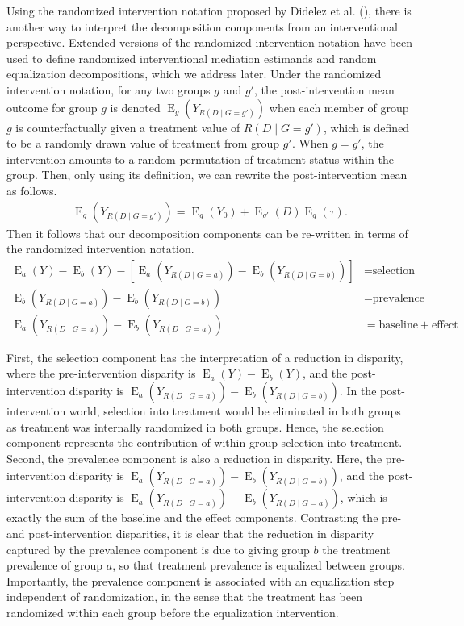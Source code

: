 \documentclass[12pt,a4paper]{article}
\newcommand{\E}{\operatorname{E}}
\begin{document}
Using the randomized intervention notation proposed by Didelez et al. (\citeyear{didelez_direct_2006}), there is another way to interpret the decomposition components from an interventional perspective. Extended versions of the randomized intervention notation have been used to define randomized interventional mediation estimands and random equalization decompositions, which we address later. 
Under the randomized intervention notation, for any two groups $g$ and $g'$, the post-intervention mean outcome for group $g$ is denoted $\E_g \left(Y_{R(D \mid  G=g') } \right)$ when each member of group $g$ is counterfactually given a treatment value of $R(D \mid  G=g')$, which is defined to be a randomly drawn value of treatment from group $g'$. When $g=g'$, the intervention amounts to a random permutation of treatment status within the group. Then, only using its definition, we can rewrite the post-intervention mean as follows.
\begin{align}
    \E_g \left(Y_{R(D \mid  G=g') } \right) = \E_g (Y_0) + \E_{g'}(D)\E_g(\tau). \label{eqt2}
\end{align}
Then it follows that our decomposition components can be re-written in terms of the randomized intervention notation.
\begin{align*}
   \E_a(Y) - \E_b(Y) - \left[ \E_a \left(Y_{R(D \mid G=a)} \right) - \E_b \left(Y_{R(D \mid G=b)}\right) \right] &= \text{selection} \\
   \E_b \left(Y_{R(D \mid G=a)} \right)-\E_b \left(Y_{R(D \mid G=b)} \right)  &= \text{prevalence} \\
   \E_a \left(Y_{R(D \mid G=a)} \right)-\E_b \left(Y_{R(D \mid G=a)} \right)  &= \text{baseline} + \text{effect} 
\end{align*}

First, the selection component has the interpretation of a reduction in disparity, where the pre-intervention disparity is $\E_a(Y) - \E_b(Y)$, and the post-intervention disparity is $\E_a \left(Y_{R(D \mid G=a)} \right) - \E_b \left(Y_{R(D \mid G=b)}\right)$. In the post-intervention world, selection into treatment would be eliminated in both groups as treatment was internally randomized in both groups. Hence, the selection component represents the contribution of within-group selection into treatment. Second, the prevalence component is also a reduction in disparity. Here, the pre-intervention disparity is $\E_a \left(Y_{R(D \mid G=a)} \right) - \E_b \left(Y_{R(D \mid G=b)}\right)$, and the post-intervention disparity is $\E_a \left(Y_{R(D \mid G=a)} \right)-\E_b \left(Y_{R(D \mid G=a)} \right)$, which is exactly the sum of the baseline and the effect components. Contrasting the pre- and post-intervention disparities, it is clear that the reduction in disparity captured by the prevalence component is due to giving group $b$ the treatment prevalence of group $a$, so that treatment prevalence is equalized between groups. Importantly, the prevalence component is associated with an equalization step independent of randomization, in the sense that the treatment has been randomized within each group before the equalization intervention.
\end{document}
